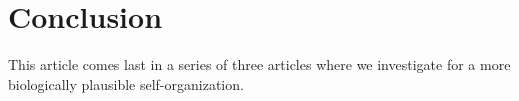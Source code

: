 \section{Conclusion}

This article comes last in a series of three articles where we investigate for
a more biologically plausible self-organization. 















  





  
  



